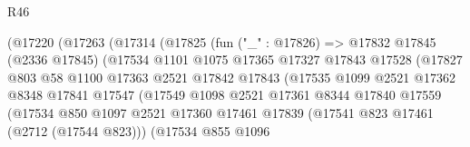 \begin{lexlean}{R46}
\begin{coremodule}
                                (@17220
                                  (@17263
                                    (@17314
                                      (@17825
                                        (fun ("_" : @17826) =>
                                        @17832
                                          @17845
                                          (@2336 @17845)
                                          (@17534
                                            @1101
                                            @1075
                                            @17365
                                            @17327
                                            @17843
                                            @17528
                                            (@17827
                                              @803
                                              @58
                                              @1100
                                              @17363
                                              @2521
                                              @17842
                                              @17843
                                              (@17535
                                                @1099
                                                @2521
                                                @17362
                                                @8348
                                                @17841
                                                @17547
                                                (@17549
                                                  @1098
                                                  @2521
                                                  @17361
                                                  @8344
                                                  @17840
                                                  @17559
                                                  (@17534
                                                    @850
                                                    @1097
                                                    @2521
                                                    @17360
                                                    @17461
                                                    @17839
                                                    (@17541 @823 @17461 (@2712 (@17544 @823)))
                                                    (@17534
                                                      @855
                                                      @1096

\end{coremodule}
\end{lexlean}
